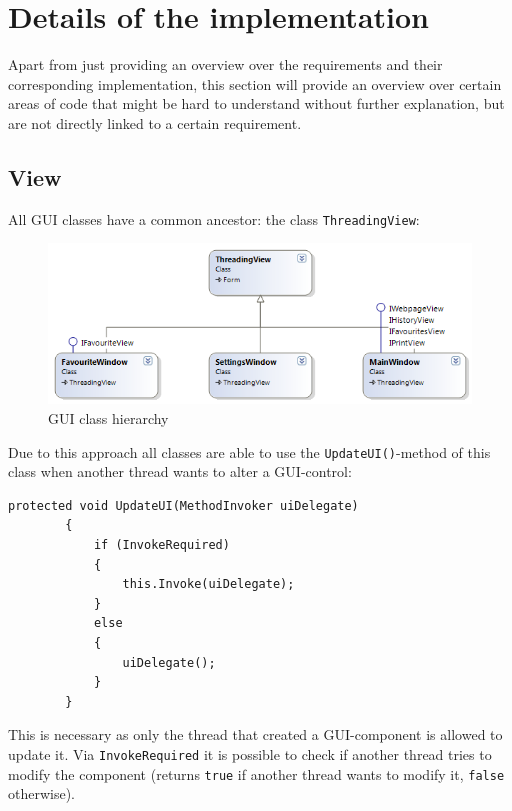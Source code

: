\section{Details of the implementation}
\label{sec:details_implementation}

Apart from just providing an overview over the requirements and their corresponding implementation, this section will provide an overview over certain areas of code that might be hard to understand without further explanation, but are not directly linked to a certain requirement.

\subsection{View}

All \ac{GUI} classes have a common ancestor: the class \texttt{ThreadingView}:

\begin{figure}[H]
\begin{center}
\includegraphics[width=\textwidth]{gfx/view_diagram.png}
\caption{\ac{GUI} class hierarchy}
\label{fig:view_diagram}
\end{center}
\end{figure}

Due to this approach all classes are able to use the \texttt{UpdateUI()}-method of this class when another thread wants to alter a \ac{GUI}-control:

\begin{lstlisting}
protected void UpdateUI(MethodInvoker uiDelegate)
        {
            if (InvokeRequired)
            {
                this.Invoke(uiDelegate);
            }
            else
            {
                uiDelegate();
            }
        }
\end{lstlisting}

This is necessary as only the thread that created a \ac{GUI}-component is allowed to update it.
Via \texttt{InvokeRequired} it is possible to check if another thread tries to modify the component (returns \texttt{true} if another thread wants to modify it, \texttt{false} otherwise).

